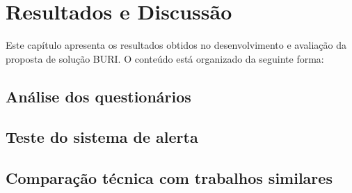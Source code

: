 \chapter{Resultados e Discussão}

Este capítulo apresenta os resultados obtidos no desenvolvimento e avaliação da proposta de solução BURI. O conteúdo 
está organizado da seguinte forma: 

\section{Análise dos questionários}\label{questionario}

\section{Teste do sistema de alerta}\label{alerta}

\section{Comparação técnica com trabalhos similares}\label{comparacao}